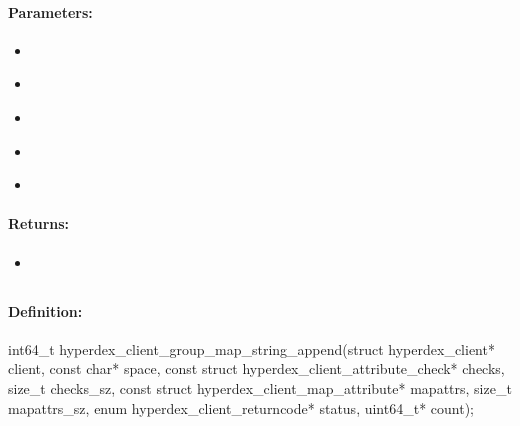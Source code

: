 \paragraph{Parameters:}
\begin{itemize}[noitemsep]
\item {}\\

\item {}\\

\item {}\\

\item {}\\

\item {}\\

\end{itemize}

\paragraph{Returns:}
\begin{itemize}[noitemsep]
\item {}\\

\end{itemize}

\pagebreak
\subsection{}
\label{api:c:group_map_string_append}


\paragraph{Definition:}
\begin{ccode}
int64_t hyperdex_client_group_map_string_append(struct hyperdex_client* client,
        const char* space,
        const struct hyperdex_client_attribute_check* checks, size_t checks_sz,
        const struct hyperdex_client_map_attribute* mapattrs, size_t mapattrs_sz,
        enum hyperdex_client_returncode* status,
        uint64_t* count);
\end{ccode}

